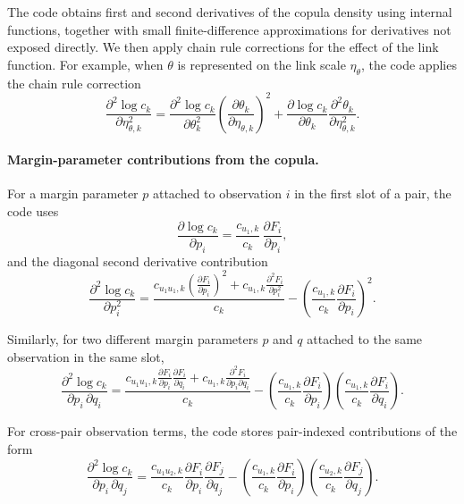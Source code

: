 \documentclass{article}
\begin{document}
The code obtains first and second derivatives of the copula density using
internal functions, together with small finite-difference approximations for derivatives not exposed directly. We then apply chain rule corrections for the effect of the link function. For example, when $\theta$ is represented on the link scale $\eta_\theta$, the code applies the chain rule
correction
\begin{equation*}
\frac{\partial^2 \log c_k}{\partial \eta_{\theta,k}^2}
=
\frac{\partial^2 \log c_k}{\partial \theta_k^2}
\left(\frac{\partial \theta_k}{\partial \eta_{\theta,k}}\right)^2
+
\frac{\partial \log c_k}{\partial \theta_k}
\frac{\partial^2 \theta_k}{\partial \eta_{\theta,k}^2}.
\end{equation*}

\paragraph{Margin-parameter contributions from the copula.}
For a margin parameter $p$ attached to observation $i$ in the first slot of a pair,
the code uses
\begin{equation*}
\frac{\partial \log c_k}{\partial p_i}
= \frac{c_{u_1,k}}{c_k}\,\frac{\partial F_i}{\partial p_i},
\end{equation*}
and the diagonal second derivative contribution
\begin{equation*}
\frac{\partial^2 \log c_k}{\partial p_i^2}
=
\frac{c_{u_1u_1,k}\left(\frac{\partial F_i}{\partial p_i}\right)^2 + c_{u_1,k}\frac{\partial^2 F_i}{\partial p_i^2}}{c_k}
-
\left(\frac{c_{u_1,k}}{c_k}\frac{\partial F_i}{\partial p_i}\right)^2.
\end{equation*}

Similarly, for two different margin parameters $p$ and $q$ attached to the same observation in the
same slot,
\begin{equation*}
\frac{\partial^2 \log c_k}{\partial p_i\,\partial q_i}
=
\frac{c_{u_1u_1,k}\frac{\partial F_i}{\partial p_i}\frac{\partial F_i}{\partial q_i} + c_{u_1,k}\frac{\partial^2 F_i}{\partial p_i\partial q_i}}{c_k}
-
\left(\frac{c_{u_1,k}}{c_k}\frac{\partial F_i}{\partial p_i}\right)
\left(\frac{c_{u_1,k}}{c_k}\frac{\partial F_i}{\partial q_i}\right).
\end{equation*}

For cross-pair observation terms, the code stores pair-indexed contributions of the form
\begin{equation*}
\frac{\partial^2 \log c_k}{\partial p_i\,\partial q_j}
=
\frac{c_{u_1u_2,k}}{c_k}
\frac{\partial F_i}{\partial p_i}
\frac{\partial F_j}{\partial q_j}
-
\left(\frac{c_{u_1,k}}{c_k}\frac{\partial F_i}{\partial p_i}\right)
\left(\frac{c_{u_2,k}}{c_k}\frac{\partial F_j}{\partial q_j}\right).
\end{equation*}
\end{document}
